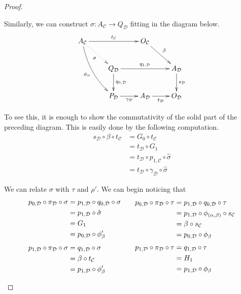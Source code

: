 \documentclass[a4paper,UKenglish,cleveref,pdftex,thm-restate,numberwithinsect]{lipics-v2021}
\begin{document}
\begin{proof}
\begin{enumerate}
\begin{itemize}
			Similarly, we can construct $\sigma \colon A_{\mathcal{C}}\to Q_{\mathcal{D}}$ fitting in the diagram below.
					 \[\xymatrix{  A_{\mathcal{C}} \ar@/_.3cm/[ddr]_{\phi_{\alpha}} \ar[rr]^{t_{\mathcal{C}}} \ar@{.>}[dr]_{\sigma}&& O_{\mathcal{C}} \ar[dr]^{\beta}\\& Q_{\mathcal{D}} \ar[rr]^{q_{1, \mathcal{D}}}  \ar[d]^{q_{0, \mathcal{D}}} & & A_{\mathcal{D}} \ar[d]^{s_{\mathcal{D}}} \\ &   P_{\mathcal{D}} \ar[r]_{\gamma_{\mathcal{D}}}& A_{\mathcal{D}} \ar[r]_{t_{\mathcal{D}}} & O_{\mathcal{D}} }\]
			
			To see this, it is enough to show the commutativity of the solid part of the preceding diagram. This is easily done by the following computation. 
				 \begin{align*}
			s_{\mathcal{D}}\circ \beta \circ t_{\mathcal{C}}&=G_0\circ t_{\mathcal{C}}
	\\&=
			t_{\mathcal{D}}\circ G_1
			\\&=
			t_{\mathcal{D}}\circ p_{1, \mathcal{C}} \circ \hat{\sigma}
			\\&=
				t_{\mathcal{D}}\circ \gamma_{\mathcal{D}}\circ \hat{\sigma}			\end{align*}
			
			We can relate $\sigma$ with $\tau$ and $\rho'$. We can begin noticing that
			\[\begin{split}
				p_{0, \mathcal{D}}\circ \pi_{\mathcal{D}}\circ \sigma &= p_{1, \mathcal{D}}\circ q_{0, \mathcal{D}}\circ \sigma \\&=p_{1, \mathcal{D}} \circ \hat{\sigma}\\&=G_1	\\&=p_{0, \mathcal{D}}\circ  \phi'_{\beta} \\[.2\baselineskip] p_{1, \mathcal{D}}\circ \pi_{\mathcal{D}}\circ \sigma &=  q_{1, \mathcal{D}}\circ \sigma \\&=\beta \circ t_{\mathcal{C}}\\&=p_{1, \mathcal{D}}\circ  \phi'_{\beta} 
			\end{split} \qquad\begin{split}
			p_{0, \mathcal{D}}\circ \pi_{\mathcal{D}}\circ \tau &= p_{1, \mathcal{D}}\circ q_{0, \mathcal{D}}\circ \tau \\&=p_{1, \mathcal{D}} \circ \phi_{(\alpha, \beta)} \circ s_{\mathcal{C}}\\&=\beta	\circ s_{\mathcal{C}} \\&=p_{0, \mathcal{D}} \circ \phi_{\beta}  \\[.2\baselineskip] 	p_{1, \mathcal{D}}\circ \pi_{\mathcal{D}}\circ \tau &=  q_{1, \mathcal{D}}\circ \tau \\&=H_1 \\&=p_{1, \mathcal{D}} \circ \phi_{\beta}
			\end{split} \] 
	

\end{itemize}
\end{enumerate}
\end{proof}
\end{document}
